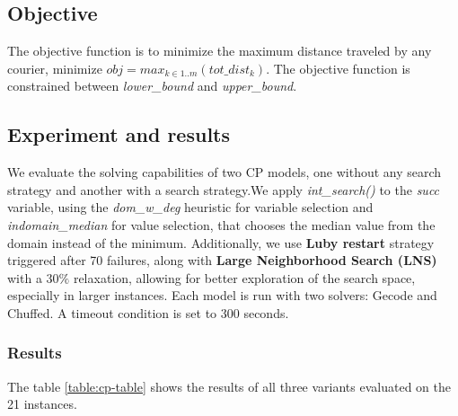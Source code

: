 \documentclass{article}
\begin{document}
\subsection{Objective}
The objective function is to minimize the maximum distance traveled by any courier, minimize $obj= max_{k \in 1..m}(tot\_dist_k)$. The objective function is constrained between \textit{lower\_bound} and \textit{upper\_bound}.

\subsection{Experiment and results}
We evaluate the solving capabilities of two CP models, one without any search strategy and another with a search strategy.We apply \textit{int\_search()} to the \textit{succ} variable, using the \textit{dom\_w\_deg} heuristic for variable selection and \textit{indomain\_median} for value selection, that chooses the median value from the domain instead of the minimum. Additionally, we use \textbf{Luby restart} strategy triggered after 70 failures, along with \textbf{Large Neighborhood Search (LNS)} with a $30\%$ relaxation, allowing for better exploration of the search space, especially in larger instances. Each model is run with two solvers: Gecode and Chuffed. A timeout
condition is set to 300 seconds.

\subsubsection{Results}

The table \ref{table:cp-table} shows the results of all three variants evaluated on the 21 instances.
\end{document}
